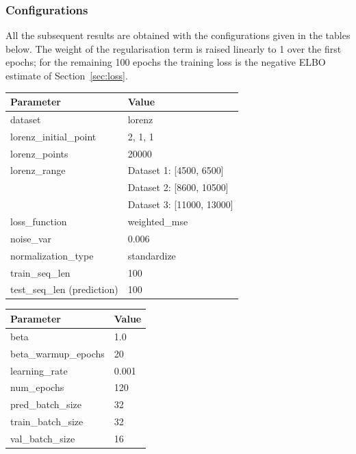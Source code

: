     \subsubsection*{Configurations}
    All the subsequent results are obtained with the configurations
    given in the tables below. The weight  of the
    regularisation term is raised linearly to 1 over the first
     epochs; for the remaining 100 epochs
    the training loss is the negative ELBO estimate of
    Section~\ref{sec:loss}.\\
    
    \begin{minipage}{0.48\textwidth}
        \centering
        \small
        \label{tab:args_config}
        \begin{tabular}{|l|l|}
        \hline
        \textbf{Parameter} & \textbf{Value} \\ \hline
        dataset & lorenz \\ \hline
        lorenz\_initial\_point & 2, 1, 1 \\ \hline
        lorenz\_points & 20000 \\ \hline
        lorenz\_range & Dataset 1: [4500, 6500] \\
        & Dataset 2: [8600, 10500]\\
        & Dataset 3: [11000, 13000]\\ \hline
        loss\_function & weighted\_mse \\ \hline
        noise\_var & 0.006 \\ \hline
        normalization\_type & standardize \\ \hline
        train\_seq\_len & 100 \\ \hline
        test\_seq\_len (prediction) & 100 \\ \hline
        \end{tabular}
    \end{minipage}
    \hfill
    \begin{minipage}{0.45\textwidth}
        \centering
            \label{tab:training_config_config}
            \begin{tabular}{|l|l|}
            \hline
            \textbf{Parameter} & \textbf{Value} \\ \hline
            beta & 1.0 \\ \hline
            beta\_warmup\_epochs & 20 \\ \hline
            learning\_rate & 0.001 \\ \hline
            num\_epochs & 120 \\ \hline
            pred\_batch\_size & 32 \\ \hline
            train\_batch\_size & 32 \\ \hline
            val\_batch\_size & 16 \\ \hline
            \end{tabular}
    \end{minipage}
    
